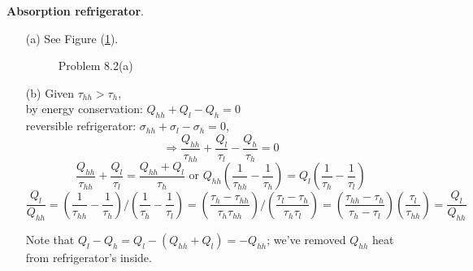 \documentclass[twoside]{amsart}
\theoremstyle{plain}
\theoremstyle{definition}
\newcommand{\solutionhead}[1]
  {
   \noindent{\small\bf Solution #1.}
   }
\begin{document}
\solutionhead{2} \textbf{Absorption refrigerator}.  
\begin{itemize}
\item[(a)] See Figure (\ref{Fi:Problem08.2(a)}).  \begin{figure}
\caption{Problem 8.2(a)}\label{Fi:Problem08.2(a)}
\end{figure}
\item[(b)] Given $\tau_{hh} > \tau_h$, \\
  by energy conservation: $Q_{hh} + Q_l - Q_h = 0$ \\
  reversible refrigerator: $\sigma_{hh} + \sigma_l - \sigma_h = 0$,
\[
\Longrightarrow \frac{Q_{hh} }{ \tau_{hh} } + \frac{ Q_l }{ \tau_l} - \frac{Q_h}{ \tau_h } = 0 
\]
\[
\frac{Q_{hh}}{\tau_{hh} } + \frac{Q_l}{ \tau_l } = \frac{Q_{hh}+Q_l }{ \tau_h} \text{ or } Q_{hh} \left( \frac{1}{ \tau_{hh}} - \frac{1}{\tau_h} \right) = Q_l \left( \frac{1}{\tau_h } - \frac{1}{ \tau_l } \right)
\]
\[
\frac{Q_l}{ Q_{hh}} = \left( \frac{1}{ \tau_{hh} } - \frac{1}{\tau_h} \right)/ \left( \frac{1}{\tau_h} - \frac{1}{ \tau_l } \right) = \left( \frac{ \tau_h - \tau_{hh}}{ \tau_h \tau_{hh}} \right)/ \left( \frac{\tau_l - \tau_h }{ \tau_h \tau_l } \right) = \boxed{ \left( \frac{\tau_{hh} - \tau_h }{ \tau_h - \tau_l } \right)\left( \frac{\tau_l }{ \tau_{hh} } \right) = \frac{Q_l }{ Q_{hh}} }
\]

Note that $Q_l - Q_h = Q_l - (Q_{hh} + Q_l ) = -Q_{hh}$; we've removed $Q_{hh}$ heat from refrigerator's inside.  
\end{itemize}
\end{document}
